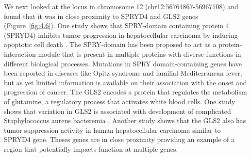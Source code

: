 We next looked at the locus in chromosome 12 (chr12:56764867-56967108) and found that it was in close proximity to SPRYD4 and GLS2 genes (Figure~\ref{fig:4.6}). One study shows that SPRY-domain containing protein 4 (SPRYD4) inhibits tumor progression in hepatocellular carcinoma by inducing apoptotic cell death \cite{zahid2019novel}. The SPRY-domain has been proposed to act as a protein-interaction module that is present in multiple proteins with diverse functions in different biological processes. Mutations in SPRY domain-containing genes have been reported in diseases like Opitz syndrome and familial Mediterranean fever, but as yet limited information is available on their association with the onset and progression of cancer. The GLS2 encodes a protein that regulates the metabolism of glutamine, a regulatory process that activates white blood cells. One study shows that variation in GLS2 is associated with development of complicated Staphylococcus aureus bacteremia \cite{scott2018human}. Another study shows that the GLS2 also has tumor suppression activity in human hepatocellular carcinoma \cite{liu2014glutaminase} similar to SPRYD4 gene. Theses genes are in close proximity providing an example of a region that potentially impacts function at multiple genes. 

